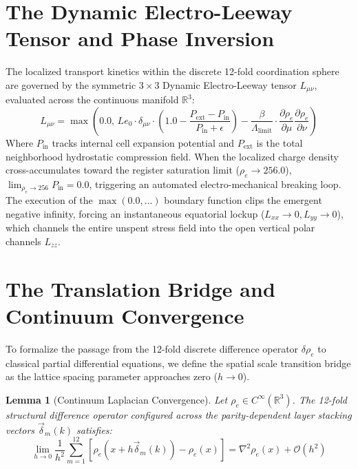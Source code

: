 \documentclass[12pt,fleqn]{article}
\newtheorem{lemma}[theorem]{Lemma}
\begin{document}
\section{The Dynamic Electro-Leeway Tensor and Phase Inversion}
The localized transport kinetics within the discrete 12-fold coordination sphere are governed by the symmetric $3 \times 3$ Dynamic Electro-Leeway tensor $L_{\mu\nu}$, evaluated across the continuous manifold $\mathbb{R}^3$:
\begin{equation}
L_{\mu\nu} = \max \left( 0.0, \, Le_0 \cdot \delta_{\mu\nu} \cdot \left( 1.0 - \frac{P_{\text{ext}} - P_{\text{in}}}{P_{\text{in}} + \epsilon} \right) - \frac{\beta}{\Lambda_{\text{limit}}} \cdot \frac{\partial \rho_e}{\partial \mu} \frac{\partial \rho_e}{\partial \nu} \right)
\end{equation}
Where $P_{\text{in}}$ tracks internal cell expansion potential and $P_{\text{ext}}$ is the total neighborhood hydrostatic compression field. When the localized charge density cross-accumulates toward the register saturation limit ($\rho_e \to 256.0$), $\lim_{\rho_e \to 256} P_{\text{in}} = 0.0$, triggering an automated electro-mechanical breaking loop. The execution of the $\max(0.0, \dots)$ boundary function clips the emergent negative infinity, forcing an instantaneous equatorial lockup ($L_{xx} \to 0, L_{yy} \to 0$), which channels the entire unspent stress field into the open vertical polar channels $L_{zz}$.

\section{The Translation Bridge and Continuum Convergence}
To formalize the passage from the 12-fold discrete difference operator $\delta \rho_e$ to classical partial differential equations, we define the spatial scale transition bridge as the lattice spacing parameter approaches zero ($h \to 0$).

\begin{lemma}[Continuum Laplacian Convergence]
Let $\rho_e \in C^\infty(\mathbb{R}^3)$. The 12-fold structural difference operator configured across the parity-dependent layer stacking vectors $\vec{\delta}_m(k)$ satisfies:
\begin{equation}
\lim_{h \to 0} \frac{1}{h^2} \sum_{m=1}^{12} \left[ \rho_e(x + h \vec{\delta}_m(k)) - \rho_e(x) \right] = \nabla^2 \rho_e(x) + \mathcal{O}(h^2)
\end{equation}
\end{lemma}
\end{document}
